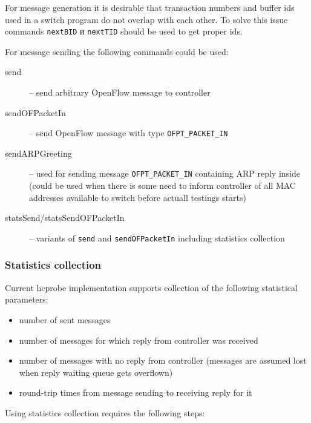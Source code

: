 \documentclass[9pt,a4paper]{article}
\begin{document}
For message generation it is desirable that transaction numbers and
buffer ids used in a switch program do not overlap with each
other. To solve this issue commands \lstinline!nextBID! и
\lstinline!nextTID! should be used to get proper ids.

For message sending the following commands could be used:

\begin{description}

  \item[send] -- send arbitrary OpenFlow message to controller

  \item[sendOFPacketIn] -- send OpenFlow message with type
    \lstinline!OFPT_PACKET_IN!

  \item[sendARPGreeting] -- used for sending message
    \lstinline!OFPT_PACKET_IN!  containing ARP reply inside (could be
    used when there is some need to inform controller of all MAC
    addresses available to switch before actuall testings starts)

  \item[statsSend/statsSendOFPacketIn] -- variants of \lstinline!send!
    and \lstinline!sendOFPacketIn! including statistics collection

\end{description}

\subsubsection{Statistics collection}

Current hcprobe implementation supports collection of the following
statistical parameters:

\begin{itemize}
  \item number of sent messages
  \item number of messages for which reply from controller was
    received
  \item number of messages with no reply from controller (messages are
    assumed lost when reply waiting queue gets overflown)
  \item round-trip times from message sending to receiving reply for it
\end{itemize}

Using statistics collection requires the following steps:
\end{document}
